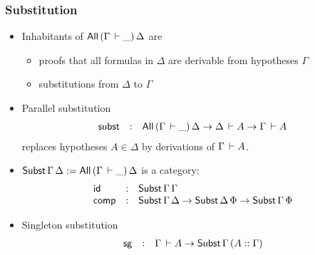 \documentclass[t,fleqn,usenames,dvipsnames]{beamer}
\begin{document}
\begin{frame}%
  \frametitle{Substitution}
  \vspace{-3ex}
  \begin{itemize}
  \item Inhabitants of $\mathsf{All}\,(\Gamma \,\vdash \_)\,\Delta$ are
    \begin{itemize}
    \item proofs that all formulas in $\Delta$ are derivable from
      hypotheses $\Gamma$
    \item substitutions from $\Delta$ to $\Gamma$
    \end{itemize}
  \item Parallel substitution
\[
  \begin{array}{lcl}
    \mathsf{subst} & : & \mathsf{All}\,(\Gamma \,\vdash \_)\,\Delta \to \Delta \,\vdash A \to
                  \Gamma \,\vdash A
  \end{array}
\]
    replaces hypotheses $A \in \Delta$ by derivations of $\Gamma \,\vdash A$.
  \item $\mathsf{Subst}\,\Gamma\,\Delta := \mathsf{All}\,(\Gamma \,\vdash \_)\,\Delta$ is
    a category:
\[
  \begin{array}{lcl}
    \mathsf{id}   & : & \mathsf{Subst}\,\Gamma\,\Gamma \\
    \mathsf{comp} & : & \mathsf{Subst}\,\Gamma\,\Delta \to \mathsf{Subst}\,\Delta\,\Phi \to
                 \mathsf{Subst}\,\Gamma\,\Phi \\
  \end{array}
\]
  \item Singleton substitution
\[
  \begin{array}{lcl}
\mathsf{sg} & : & \Gamma \,\vdash A \to \mathsf{Subst}\,\Gamma\,(A :: \Gamma)
  \end{array}
\]
  \end{itemize}
\end{frame}

\newcommand{\tne}{\mathsf{ne}}
\end{document}
